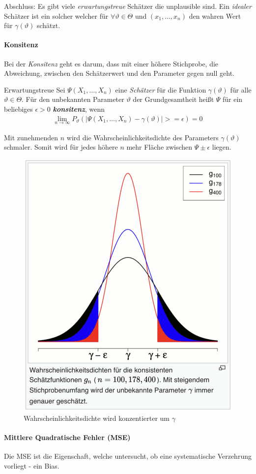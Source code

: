 Abschluss: Es gibt viele \textit{erwartungstreue} Schätzer die unplausible sind. Ein \textit{idealer} Schätzer ist ein solcher welcher für $\forall \vartheta \in \Theta$ und $(x_1,\dots,x_n)$ den wahren Wert für $\gamma(\vartheta)$ schätzt.

\paragraph{Konsitenz}
Bei der \textit{Konsitenz} geht es darum, dass mit einer höhere Stichprobe, die Abweichung, zwischen den Schätzerwert und den Parameter gegen null geht.

\begin{Definition}{Erwartungstreue}
	Sei $\Psi(X_1,\dots, X_n)$ eine \textit{Schätzer} für die Funktion $\gamma(\vartheta)$ für alle $\vartheta\in \Theta$. Für den unbekannten Parameter $\vartheta$ der Grundgesamtheit heißt $\Psi$ für ein beliebiges $\epsilon >0$ \textit{\textbf{konsitenz}}, wenn
\begin{align}
	\lim_{n\rightarrow \infty} P_{\vartheta}\left(\lvert \Psi(X_1,\dots,X_n) - \gamma(\vartheta)\rvert>= \epsilon \right) = 0
\end{align}	  
\end{Definition}
Mit zunehmenden $n$ wird die Wahrscheinlichkeitsdichte des Parameters $\gamma(\vartheta)$ schmaler. Somit wird für jedes höhere $n$ mehr Fläche zwischen $\Psi \pm \epsilon$ liegen.
\begin{figure}[H]
	\centering
	\includegraphics[width=0.5\linewidth]{attachment/chapter_13/Scc074}
	\caption{Wahrscheinlichkeitsdichte wird konzentierter um $\gamma$}
\end{figure}

\paragraph{Mittlere Quadratische Fehler (MSE)}
Die \gls{MSE} ist die Eigenschaft, welche untersucht, ob eine systematische Verzehrung vorliegt - ein Bias.

